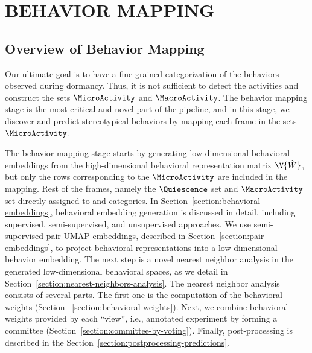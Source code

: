 \setlength{\parindent}{0pt}
\chapter{\bf BEHAVIOR MAPPING}\label{chapter:behavior-mapping}
\section{Overview of Behavior Mapping}
Our ultimate goal is to have a fine-grained categorization of the behaviors observed during dormancy. Thus, it is not sufficient to detect the activities and construct the sets $\MicroActivity$ and $\MacroActivity$. The behavior mapping stage is the most critical and novel part of the pipeline, and in this stage, we discover and predict stereotypical behaviors by mapping each frame in the sets $\MicroActivity$.

The behavior mapping stage starts by generating low-dimensional behavioral embeddings from the high-dimensional behavioral representation matrix $\V{\hat{W}}$, but only the rows corresponding to the $\MicroActivity$ are included in the mapping.
Rest of the frames, namely the $\Quiescence$ set and $\MacroActivity$ set directly assigned to \QuiescentOther and \Moving categories.
In Section~\ref{section:behavioral-embeddings}, behavioral embedding generation is discussed in detail, including supervised, semi-supervised, and unsupervised approaches.
We use semi-supervised pair UMAP embeddings, described in Section~\ref{section:pair-embeddings}, to project behavioral representations into a low-dimensional behavior embedding.
The next step is a novel nearest neighbor analysis in the generated low-dimensional behavioral spaces, as we detail in Section~\ref{section:nearest-neighbors-analysis}.
The nearest neighbor analysis consists of several parts.
The first one is the computation of the behavioral weights (Section ~\ref{section:behavioral-weights}).
Next, we combine behavioral weights provided by each ``view'', i.e., annotated experiment by forming a committee (Section~\ref{section:committee-by-voting}).
Finally, post-processing is described in the Section~\ref{section:postprocessing-predictions}.

